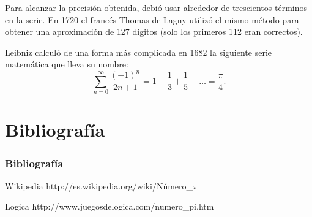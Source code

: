 \documentclass{beamer}
\begin{document}
\begin{frame}
Para alcanzar la precisión obtenida, debió usar alrededor de trescientos términos en la serie. En 1720 el francés Thomas de Lagny utilizó el mismo método para obtener una aproximación de 127 dígitos (solo los primeros 112 eran correctos).

Leibniz calculó de una forma más complicada en 1682 la siguiente serie matemática que lleva su nombre:
\begin{displaymath} 
    \sum_{n=0}^{\infty} \frac{(-1)^n}{2n+1} = 1 - \frac{1}{3} + \frac{1}{5} - \dots = \frac{\pi}{4} . 
\end{displaymath}
\end{frame}


\section{Bibliografía}
\begin{frame}
  \frametitle{Bibliografía}

  \begin{thebibliography}{10}
   

    \beamertemplatebookbibitems
     Wikipedia {\small http://es.wikipedia.org/wiki/Número\_$\pi$ }

    \beamertemplatebookbibitems
    Logica {\small http://www.juegosdelogica.com/numero\_pi.htm}

  \end{thebibliography}
\end{frame}

\end{document}
